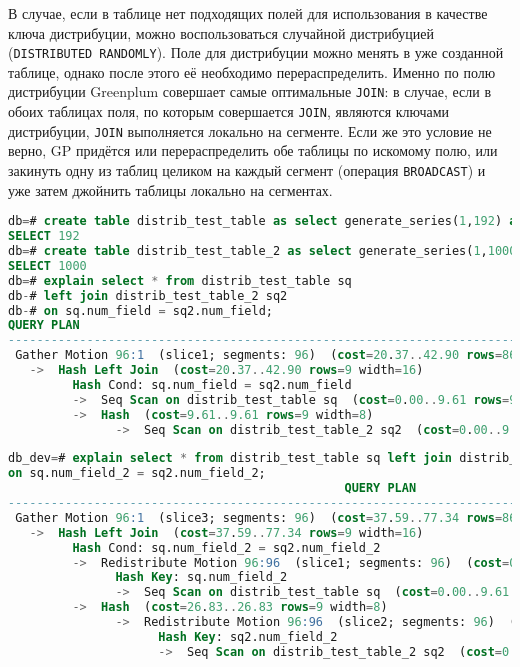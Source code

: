 В случае, если в таблице нет подходящих полей для использования в качестве ключа дистрибуции, можно воспользоваться случайной дистрибуцией (\lstinline!DISTRIBUTED RANDOMLY!). Поле для дистрибуции можно менять в уже созданной таблице, однако после этого её необходимо перераспределить.
Именно по полю дистрибуции Greenplum совершает самые оптимальные \lstinline!JOIN!: в случае, если в обоих таблицах поля, по которым совершается \lstinline!JOIN!, являются ключами дистрибуции, \lstinline!JOIN! выполняется локально на сегменте. Если же это условие не верно, GP придётся или перераспределить обе таблицы по искомому полю, или закинуть одну из таблиц целиком на каждый сегмент (операция \lstinline!BROADCAST!) и уже затем джойнить таблицы локально на сегментах.

\begin{lstlisting}[language=SQL,label=lst:greenplum_example2,caption=JOIN по ключу дистрибуции]
db=# create table distrib_test_table as select generate_series(1,192) as num_field, generate_series(1,192) as num_field_2 distributed by (num_field);
SELECT 192
db=# create table distrib_test_table_2 as select generate_series(1,1000) as num_field, generate_series(1,1000) as num_field_2 distributed by (num_field);
SELECT 1000
db=# explain select * from distrib_test_table sq
db-# left join distrib_test_table_2 sq2
db-# on sq.num_field = sq2.num_field;
QUERY PLAN
------------------------------------------------------------------------------------------
 Gather Motion 96:1  (slice1; segments: 96)  (cost=20.37..42.90 rows=861 width=16)
   ->  Hash Left Join  (cost=20.37..42.90 rows=9 width=16)
         Hash Cond: sq.num_field = sq2.num_field
         ->  Seq Scan on distrib_test_table sq  (cost=0.00..9.61 rows=9 width=8)
         ->  Hash  (cost=9.61..9.61 rows=9 width=8)
               ->  Seq Scan on distrib_test_table_2 sq2  (cost=0.00..9.61 rows=9 width=8)
\end{lstlisting}

\begin{lstlisting}[language=SQL,label=lst:greenplum_example3,caption=JOIN не по ключу дистрибуции]
db_dev=# explain select * from distrib_test_table sq left join distrib_test_table_2 sq2
on sq.num_field_2 = sq2.num_field_2;
                                               QUERY PLAN
--------------------------------------------------------------------------------------------------------
 Gather Motion 96:1  (slice3; segments: 96)  (cost=37.59..77.34 rows=861 width=16)
   ->  Hash Left Join  (cost=37.59..77.34 rows=9 width=16)
         Hash Cond: sq.num_field_2 = sq2.num_field_2
         ->  Redistribute Motion 96:96  (slice1; segments: 96)  (cost=0.00..26.83 rows=9 width=8)
               Hash Key: sq.num_field_2
               ->  Seq Scan on distrib_test_table sq  (cost=0.00..9.61 rows=9 width=8)
         ->  Hash  (cost=26.83..26.83 rows=9 width=8)
               ->  Redistribute Motion 96:96  (slice2; segments: 96)  (cost=0.00..26.83 rows=9 width=8)
                     Hash Key: sq2.num_field_2
                     ->  Seq Scan on distrib_test_table_2 sq2  (cost=0.00..9.61 rows=9 width=8)


\end{lstlisting}


